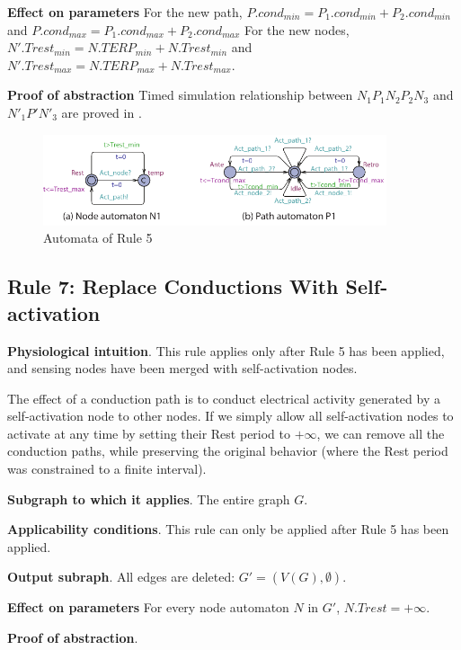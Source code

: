 \textbf{Effect on parameters}
For the new path, $P.cond_{min}=P_1.cond_{min}+P_2.cond_{min}$ and 
$P.cond_{max}=P_1.cond_{max}+P_2.cond_{max}$
For the new nodes, $N'.Trest_{min}=N.TERP_{min}+N.Trest_{min}$ and 
$N'.Trest_{max}=N.TERP_{max}+N.Trest_{max}$.


\textbf{Proof of abstraction} Timed simulation relationship between $N_1 P_1 N_2 P_2 N_3$ and $N'_1 P' N'_3$ are proved in \cite{sttt13}.

\begin{figure}[!h]
	\centering
	\includegraphics[width=0.9\textwidth]{figs/rule5.pdf}
	\caption{\small Automata of Rule 5}
	\label{fig:rule5}
\end{figure}

\subsection{Rule 7: Replace Conductions With Self-activation}
\textbf{Physiological intuition}. 
This rule applies only after Rule 5 has been applied, and sensing nodes have been merged with self-activation nodes.

The effect of a conduction path is to conduct electrical activity generated by a self-activation node to other nodes. 
If we simply allow all self-activation nodes to activate at any time by setting their Rest period to $+\infty$, we can remove all the conduction paths, while preserving the original behavior (where the Rest period was constrained to a finite interval).

\textbf{Subgraph to which it applies}.
The entire graph $G$.

\textbf{Applicability conditions}.
This rule can only be applied after Rule 5 has been applied.

\textbf{Output subraph}.
All edges are deleted: $G' = (V(G), \emptyset)$.

\textbf{Effect on parameters}
For every node automaton $N$ in $G'$, $N.Trest = +\infty$.

\textbf{Proof of abstraction}.

